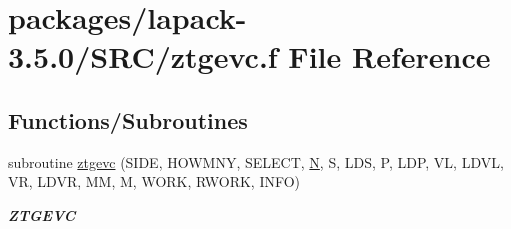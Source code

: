 \hypertarget{ztgevc_8f}{}\section{packages/lapack-\/3.5.0/\+S\+R\+C/ztgevc.f File Reference}
\label{ztgevc_8f}
\subsection*{Functions/\+Subroutines}
\begin{DoxyCompactItemize}
\item 
subroutine \hyperlink{group__complex16GEcomputational_ga2a837a77c5ce9171f8d29a3955ba645f}{ztgevc} (S\+I\+D\+E, H\+O\+W\+M\+N\+Y, S\+E\+L\+E\+C\+T, \hyperlink{polmisc_8c_a0240ac851181b84ac374872dc5434ee4}{N}, S, L\+D\+S, P, L\+D\+P, V\+L, L\+D\+V\+L, V\+R, L\+D\+V\+R, M\+M, M, W\+O\+R\+K, R\+W\+O\+R\+K, I\+N\+F\+O)
\begin{DoxyCompactList}\small\item\em {\bfseries Z\+T\+G\+E\+V\+C} \end{DoxyCompactList}\end{DoxyCompactItemize}

